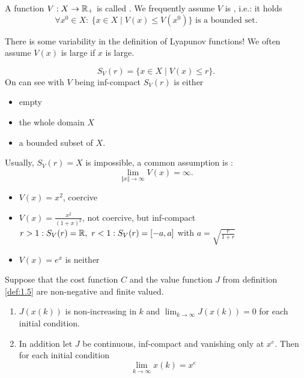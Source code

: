 
\begin{definition}\label{def:1.07}

    A function \(V:X\to \mathbb{R}_+\) is called . We frequently
    assume \(V\) is , i.e.: it holds 
    \[\forall x^0\in X:\ \{x\in X\mid V(x)\leq V(x^0)\}\text{ is a bounded set}.\]

\end{definition}

\begin{remark}
    There is some variability in the definition of Lyapunov functions! We often assume \(V(x)\) is large if \(x\) is large.
\end{remark}

 \[S_V(r)=\{x\in X \mid V(x)\leq r\}.\]
On can see with \(V\) being inf-compact \(S_V(r)\) is either
\begin{itemize}
    \item empty
    \item the whole domain \(X\) 
    \item a bounded subset of \(X\). 
\end{itemize}

Usually, \(S_V(r)=X\) is impossible, a common assumption is :
\[\lim_{\Vert x\Vert \to\infty} V(x)=\infty.\]

\begin{example}
    \begin{itemize}
        \item \(V(x)=x^2\), coercive
        \item \(V(x)=\frac{x^2}{(1+x)^2}\), not coercive, but inf-compact \(r>1: S_V(r)=\mathbb{R},\ r<1: S_V(r)=[-a,a]\) with \(a=\sqrt{\frac{r}{1+r}}\)
        \item \(V(x)=e^x\) is neither
    \end{itemize}
\end{example}

\begin{lemma}\label{lem:1.08}
    Suppose that the cost function \(C\) and the value function \(J\) from definition \ref{def:1.5} are non-negative and 
    finite valued.
    \begin{enumerate}
        \item \(J(x(k))\) is non-increasing in \(k\) and \(\lim_{k\to\infty} J(x(k))=0\) for each initial condition.
        \item In addition let \(J\) be continuous, inf-compact and vanishing only at \(x^e\). Then for each initial condition 
            \[\lim_{k\to\infty} x(k)=x^e\]
    \end{enumerate} 
\end{lemma}

